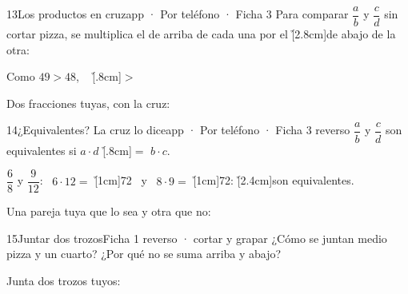 \documentclass[12pt]{article}
\begin{document}
\begin{cromo}{13}{Los productos en cruz}{app · Por teléfono · Ficha 3}
\completa Para comparar $\dfrac{a}{b}$ y $\dfrac{c}{d}$ sin cortar pizza, se multiplica el de arriba de cada una por el \h[2.8cm]{de abajo de la otra}:

\vspace{2mm}
\centerline{}

\vspace{1mm}
Como $49 > 48$, \  \h[.8cm]{$>$} 

\vspace{2mm}
\tuejemplo Dos fracciones tuyas, con la cruz:
\end{cromo}

\begin{cromobrillante}{14}{¿Equivalentes? La cruz lo dice}{app · Por teléfono · Ficha 3 reverso}
\completa $\dfrac{a}{b}$ y $\dfrac{c}{d}$ son equivalentes si $a\cdot d$ \h[.8cm]{$=$} $b\cdot c$.\par\vspace{2mm}
$\dfrac{6}{8}$ y $\dfrac{9}{12}$: \ $6\cdot 12 =$ \h[1cm]{72} \ y \ $8\cdot 9 =$ \h[1cm]{72}: \h[2.4cm]{son equivalentes}.

\vspace{2mm}
\tuejemplo Una pareja tuya que lo sea y otra que no:
\end{cromobrillante}

\begin{cromo}{15}{Juntar dos trozos}{Ficha 1 reverso · cortar y grapar}
\palabras ¿Cómo se juntan medio pizza y un cuarto? ¿Por qué no se suma arriba y abajo?

\tuejemplo Junta dos trozos tuyos:
\end{cromo}
\end{document}
